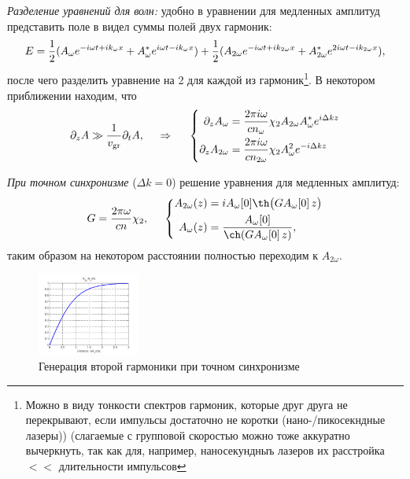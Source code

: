 \textit{Разделение уравнений для волн:} удобно в уравнении для медленных амплитуд представить поле в видел суммы полей двух гармоник:
\begin{equation*}
    E = \frac{1}{2} (A_{\omega}e^{-i\omega t +i k_{\omega}x} + A^*_{\omega}e^{i\omega t -i k_{\omega}x}) + \\ \frac{1}{2} (A_{2\omega}e^{-i\omega t +i k_{2\omega}x} + A^*_{2\omega}e^{2i\omega t -i k_{2\omega}x}),
\end{equation*}
после чего разделить уравнение на 2 для каждой из гармоник\footnote{
    Можно в виду тонкости спектров гармоник, которые друг друга не перекрывают, если импульсы достаточно не коротки (нано-/пикосекндные лазеры)) (слагаемые с групповой скоростью можно тоже аккуратно вычеркнуть, так как для, например, наносекундныъ лазеров их расстройка $<<$ длительности импульсов
}. В некотором приближении находим, что
\begin{equation*}
    \partial_z A \gg \frac{1}{v_{\textnormal{gr}}} \partial_t A,
    \hspace{0.5cm} \Rightarrow \hspace{0.5cm}
\left\{\begin{aligned}
        \partial_z A_{\omega}&=\frac{2\pi i \omega}{cn_{\omega}} \chi_{2} A_{2\omega}A^*_{\omega} e^{i \Delta k z} \\
    \partial_z A_{2\omega} &=\frac{2\pi i \omega}{cn_{2\omega}} \chi_{2} A_{\omega}^{2} e^{- i \Delta k z} 
    \end{aligned}\right.
\end{equation*}



\textit{При точном синхронизме} ($\Delta k = 0$) решение уравнения для медленных амплитуд: 
\begin{equation*}
G=\frac{2\pi \omega}{cn}\chi_{2}, \hspace{5 mm} 
    \left\{\begin{aligned}
        A_{2\omega}(z) &=iA_{\omega}[0] \th\big(G A_{\omega}[0]\,  z\big) \\
        A_{\omega}(z) &=\frac{A_\omega[0]}{\ch(G A_{\omega}[0]\, z)},
    \end{aligned}\right.
\end{equation*}
таким образом на некотором расстоянии полностью переходим к $A_{2 \omega}$.
\begin{figure}[h]
    \centering
    \includegraphics[width=0.3\textwidth]{figures/4_1.png}
    \caption{Генерация второй гармоники при точном синхронизме}
\end{figure}
